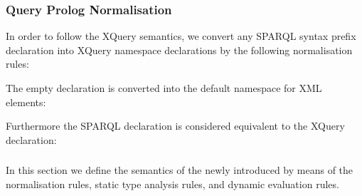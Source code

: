 \subsubsection{Query Prolog Normalisation}
\label{sec:query-prol-norm}

%
In order to follow the XQuery semantics, we convert any SPARQL syntax prefix declaration into XQuery namespace
declarations by the following normalisation rules: %
%
\begin{normalisationrule}
  \label{eq:2}
\end{normalisationrule}%
%
The empty \PREFIX declaration is converted into the default namespace for \ac{XML} elements: 
%
\begin{normalisationrule}
  \label{eq:3}
\end{normalisationrule}%
%
Furthermore the SPARQL  declaration is considered equivalent to the XQuery~ declaration:
%
\begin{normalisationrule}
  \label{eq:4}
\end{normalisationrule}%




\subsubsection{\SQLForClause}
\label{sec:semantics-rdb}

In this section we define the semantics of the newly introduced \SQLForClause by means of the normalisation rules,
static type analysis rules, and dynamic evaluation rules.

